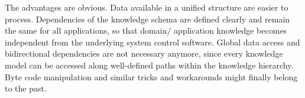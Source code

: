 The advantages are obvious. Data available in a unified structure are easier to
process. Dependencies of the knowledge schema are defined clearly and remain
the same for all applications, so that domain/ application knowledge becomes
independent from the underlying system control software. Global data access and
bidirectional dependencies are not necessary anymore, since every knowledge
model can be accessed along well-defined paths within the knowledge hierarchy.
Byte code manipulation and similar tricks and workarounds might finally belong
to the past.
